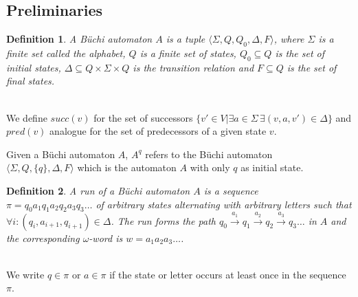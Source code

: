 \documentclass[12pt,oneside,bibliography=totoc,abstracton]{scrartcl}
\newtheorem{mydef}{Definition}
\begin{document}
\subsection{Preliminaries}
\begin{mydef}
	A \textnormal{Büchi automaton} $A$ is a tuple $\langle\Sigma, Q , Q_0, \Delta, F\rangle$, where $\Sigma$ is a finite
	set called the alphabet, $Q$ is a finite set of states, $Q_0 \subseteq Q$ is the set of initial states,
	$\Delta \subseteq Q \times \Sigma \times Q$ is the transition relation and $F \subseteq Q$ is the set of final states.
\end{mydef}\quad\\
We define $succ(v)$ for the set of successors $\{v' \in V | \exists a \in \Sigma \, \exists (v, a, v') \in \Delta\}$
and $pred(v)$ analogue for the set of predecessors of a given state $v$.

Given a Büchi automaton $A$, $A^q$ refers to the Büchi automaton\\
$\langle\Sigma, Q, \{q\}, \Delta, F\rangle$
which is the automaton $A$ with only $q$ as initial state.\\
\begin{mydef}
	A \textnormal{run} of a Büchi automaton $A$ is a sequence\\
	$\pi = q_0a_1q_1a_2q_2a_3q_3 \ldots$ of arbitrary states
	alternating with arbitrary letters such that $\forall i : (q_i, a_{i+1}, q_{i+1}) \in \Delta$.
	The \textnormal{run} forms the path $q_0 \overset{a_1}{\rightarrow} q_1 \overset{a_2}{\rightarrow}
	q_2 \overset{a_3}{\rightarrow} q_3 \ldots$ in $A$ and the corresponding $\omega$-word is
	$w = a_1a_2a_3 \ldots$.
\end{mydef}\quad\\
We write $q \in \pi$ or $a \in \pi$ if the state or letter occurs at least once in the sequence $\pi$.
\end{document}
